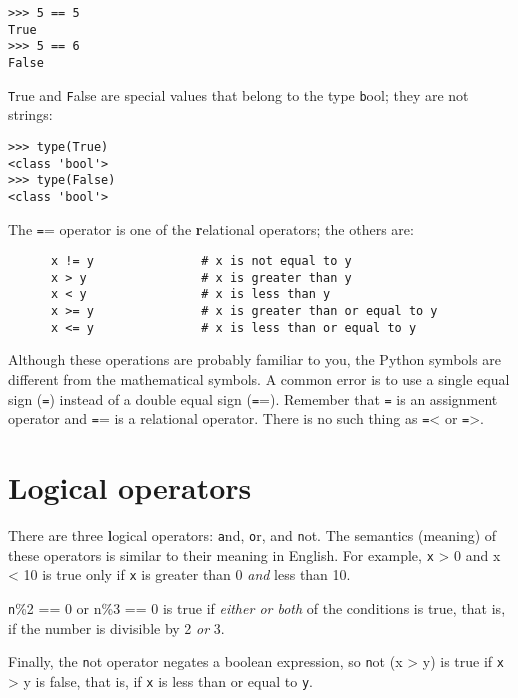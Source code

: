 \documentclass[
DIV=11,
fontsize=13,
twoside,
headinclude=false,
titlepage=firstiscover,
abstract=true,
headsepline=true,
footsepline=true,
chapterprefix=true, %
headings=big,
bibliography=totoc,%
captions=tableheading
]{scrbook}
\theoremstyle{definition}
\begin{document}
\begin{lstlisting}
>>> 5 == 5
True
>>> 5 == 6
False
\end{lstlisting}
%
{\texttt True} and {\texttt False} are special
values that belong to the type {\texttt bool}; they are not strings:

\begin{lstlisting}
>>> type(True)
<class 'bool'>
>>> type(False)
<class 'bool'>
\end{lstlisting}
%
The {\texttt ==} operator is one of the {\textbf relational operators}; the
others are:

\begin{lstlisting}
      x != y               # x is not equal to y
      x > y                # x is greater than y
      x < y                # x is less than y
      x >= y               # x is greater than or equal to y
      x <= y               # x is less than or equal to y
\end{lstlisting}
%
Although these operations are probably familiar to you, the Python
symbols are different from the mathematical symbols.  A common error
is to use a single equal sign ({\texttt =}) instead of a double equal sign
({\texttt ==}).  Remember that {\texttt =} is an assignment operator and
{\texttt ==} is a relational operator.   There is no such thing as
{\texttt =<} or {\texttt =>}.


\section {Logical operators}

There are three {\textbf logical operators}: {\texttt and}, {\texttt
or}, and {\texttt not}.  The semantics (meaning) of these operators is
similar to their meaning in English.  For example,
{\texttt x > 0 and x < 10} is true only if {\texttt x} is greater than 0
{\em and} less than 10.

{\texttt n\%2 == 0 or n\%3 == 0} is true if {\em either or both} of the
conditions is true, that is, if the number is divisible by 2 {\em or}
3.

Finally, the {\texttt not} operator negates a boolean
expression, so {\texttt not (x > y)} is true if {\texttt x > y} is false,
that is, if {\texttt x} is less than or equal to {\texttt y}.
\end{document}
